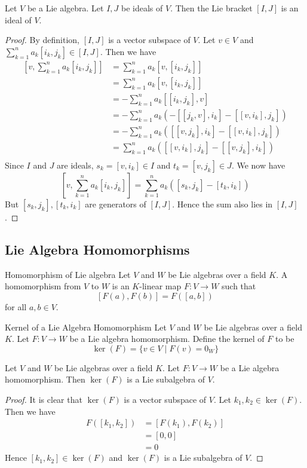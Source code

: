 \documentclass[a4paper]{article}
\begin{document}
\begin{lmm}{}{} Let $V$ be a Lie algebra. Let $I,J$ be ideals of $V$. Then the Lie bracket $[I,J]$ is an ideal of $V$. \tcbline
\begin{proof}
By definition, $[I,J]$ is a vector subspace of $V$. Let $v\in V$ and $\sum_{k=1}^na_k[i_k,j_k]\in[I,J]$. Then we have
\begin{align*}
\left[v,\sum_{k=1}^na_k[i_k,j_k]\right]&=\sum_{k=1}^na_k[v,[i_k,j_k]]\\
&=\sum_{k=1}^na_k[v,[i_k,j_k]]\\
&=-\sum_{k=1}^na_k[[i_k,j_k],v]\\
&=-\sum_{k=1}^na_k\left(-[[j_k,v],i_k]-[[v,i_k],j_k]\right)\\
&=-\sum_{k=1}^na_k\left([[v,j_k],i_k]-[[v,i_k],j_k]\right)\\
&=\sum_{k=1}^na_k\left([[v,i_k],j_k]-[[v,j_k],i_k]\right)\\
\end{align*}
Since $I$ and $J$ are ideals, $s_k=[v,i_k]\in I$ and $t_k=[v,j_k]\in J$. We now have $$\left[v,\sum_{k=1}^na_k[i_k,j_k]\right]=\sum_{k=1}^na_k\left([s_k,j_k]-[t_k,i_k]\right)$$ But $[s_k,j_k],[t_k,i_k]$ are generators of $[I,J]$. Hence the sum also lies in $[I,J]$. 
\end{proof}
\end{lmm}

\subsection{Lie Algebra Homomorphisms}
\begin{defn}{Homomorphism of Lie algebra}{} Let $V$ and $W$ be Lie algebras over a field $K$. A homomorphism from $V$ to $W$ is an $K$-linear map $F:V\to W$ such that $$[F(a),F(b)]=F\left([a,b]\right)$$ for all $a,b\in V$. 
\end{defn}

\begin{defn}{Kernel of a Lie Algebra Homomorphism}{} Let $V$ and $W$ be Lie algebras over a field $K$. Let $F:V\to W$ be a Lie algebra homomorphism. Define the kernel of $F$ to be $$\ker(F)=\{v\in V\;|\;F(v)=0_W\}$$
\end{defn}

\begin{lmm}{}{} Let $V$ and $W$ be Lie algebras over a field $K$. Let $F:V\to W$ be a Lie algebra homomorphism. Then $\ker(F)$ is a Lie subalgebra of $V$. \tcbline
\begin{proof}
It is clear that $\ker(F)$ is a vector subspace of $V$. Let $k_1,k_2\in\ker(F)$. Then we have 
\begin{align*}
F([k_1,k_2])&=[F(k_1),F(k_2)]\tag{$F$ is a Lie algebra homomorphism}\\
&=[0,0]\\
&=0
\end{align*}
Hence $[k_1,k_2]\in\ker(F)$ and $\ker(F)$ is a Lie subalgebra of $V$. 
\end{proof}
\end{lmm}
\end{document}
